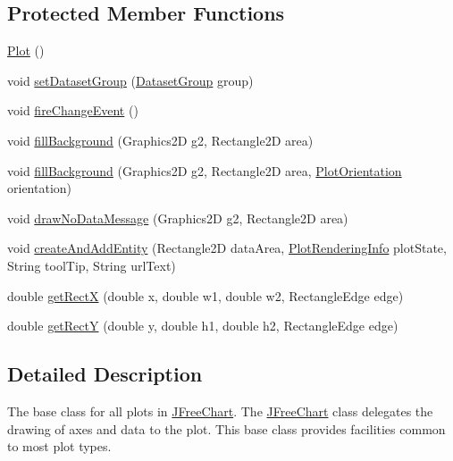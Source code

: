 \subsection*{Protected Member Functions}
\begin{DoxyCompactItemize}
\item 
\mbox{\hyperlink{classorg_1_1jfree_1_1chart_1_1plot_1_1_plot_a0ed138c3f00713af62fa19d167e38c8a}{Plot}} ()
\item 
void \mbox{\hyperlink{classorg_1_1jfree_1_1chart_1_1plot_1_1_plot_a519687029156c44ed1874e3b4cf43122}{set\+Dataset\+Group}} (\mbox{\hyperlink{classorg_1_1jfree_1_1data_1_1general_1_1_dataset_group}{Dataset\+Group}} group)
\item 
void \mbox{\hyperlink{classorg_1_1jfree_1_1chart_1_1plot_1_1_plot_a3fd64ec1923ca2075edf1330e87ede89}{fire\+Change\+Event}} ()
\item 
void \mbox{\hyperlink{classorg_1_1jfree_1_1chart_1_1plot_1_1_plot_a9a67683b45601d61fdaa719357e79d87}{fill\+Background}} (Graphics2D g2, Rectangle2D area)
\item 
void \mbox{\hyperlink{classorg_1_1jfree_1_1chart_1_1plot_1_1_plot_a5dc280b2c523fcdad0a4634f41f2cf33}{fill\+Background}} (Graphics2D g2, Rectangle2D area, \mbox{\hyperlink{classorg_1_1jfree_1_1chart_1_1plot_1_1_plot_orientation}{Plot\+Orientation}} orientation)
\item 
void \mbox{\hyperlink{classorg_1_1jfree_1_1chart_1_1plot_1_1_plot_ab47a7a1d4dfe2e9b0c222157b8522196}{draw\+No\+Data\+Message}} (Graphics2D g2, Rectangle2D area)
\item 
void \mbox{\hyperlink{classorg_1_1jfree_1_1chart_1_1plot_1_1_plot_adf00363830c96a02ffb94ea3ae785cc8}{create\+And\+Add\+Entity}} (Rectangle2D data\+Area, \mbox{\hyperlink{classorg_1_1jfree_1_1chart_1_1plot_1_1_plot_rendering_info}{Plot\+Rendering\+Info}} plot\+State, String tool\+Tip, String url\+Text)
\item 
double \mbox{\hyperlink{classorg_1_1jfree_1_1chart_1_1plot_1_1_plot_aa036f46807222674ee6acc1db9dfaad6}{get\+RectX}} (double x, double w1, double w2, Rectangle\+Edge edge)
\item 
double \mbox{\hyperlink{classorg_1_1jfree_1_1chart_1_1plot_1_1_plot_a68e4f2f03f24f9738b513f297c8e8816}{get\+RectY}} (double y, double h1, double h2, Rectangle\+Edge edge)
\end{DoxyCompactItemize}


\subsection{Detailed Description}
The base class for all plots in \mbox{\hyperlink{classorg_1_1jfree_1_1chart_1_1_j_free_chart}{J\+Free\+Chart}}. The \mbox{\hyperlink{classorg_1_1jfree_1_1chart_1_1_j_free_chart}{J\+Free\+Chart}} class delegates the drawing of axes and data to the plot. This base class provides facilities common to most plot types. 


